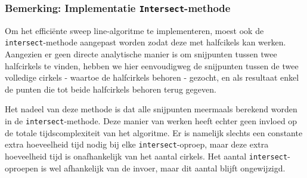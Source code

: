 \documentclass[12pt]{article}
\begin{document}

\subsubsection{Bemerking: Implementatie \texttt{Intersect}-methode}
Om het efficiënte sweep line-algoritme te implementeren, moest ook de \texttt{intersect}-methode aangepast worden zodat deze met halfcikels kan werken. Aangezien er geen directe analytische manier is om snijpunten tussen twee halfcirkels te vinden, hebben we hier eenvoudigweg de snijpunten tussen de twee volledige cirkels - waartoe de halfcirkels behoren - gezocht, en als resultaat enkel de punten die tot beide halfcirkels behoren terug gegeven.

Het nadeel van deze methode is dat alle snijpunten meermaals berekend worden in de \texttt{intersect}-methode. Deze manier van werken heeft echter geen invloed op de totale tijdscomplexiteit van het algoritme. Er is namelijk slechts een constante extra hoeveelheid tijd nodig bij elke \texttt{intersect}-oproep, maar deze extra hoeveelheid tijd is onafhankelijk van het aantal cirkels. Het aantal \texttt{intersect}-oproepen is wel afhankelijk van de invoer, maar dit aantal blijft ongewijzigd.
\end{document}

